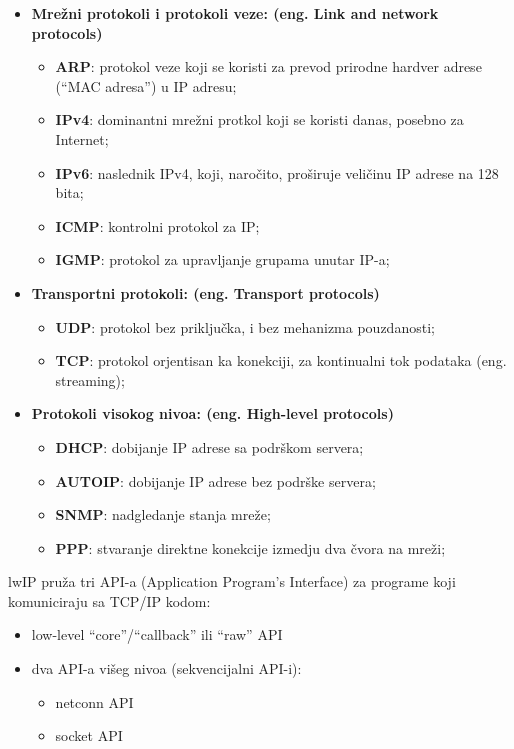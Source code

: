 \documentclass[a4paper,12pt, master]{etf}
\begin{document}
	\begin{itemize}
		\item \textbf{Mre\v{z}ni protokoli i protokoli veze: (eng\@. Link and network
		protocols)}
		\begin{itemize}
			\item \textbf{ARP}: protokol veze koji se koristi za prevod
			prirodne hardver adrese (``MAC adresa'') u IP adresu;
			\item \textbf{IPv4}: dominantni mre\v{z}ni protkol koji se koristi
			danas, posebno za Internet;
			\item \textbf{IPv6}: naslednik IPv4, koji, naro\v{c}ito,
			pro\v{s}iruje veli\v{c}inu IP adrese na 128 bita;
			\item \textbf{ICMP}: kontrolni protokol za IP;
			\item \textbf{IGMP}: protokol za upravljanje grupama unutar IP-a;
		\end{itemize}
		\item \textbf{Transportni protokoli: (eng\@. Transport protocols)}
			\begin{itemize}
				\item \textbf{UDP}: protokol bez priklju\v{c}ka, i bez
				mehanizma pouzdanosti;
				\item \textbf{TCP}: protokol orjentisan ka konekciji, za
				kontinualni tok	podataka (eng\@. streaming);
			\end{itemize}
		\item \textbf{Protokoli visokog nivoa: (eng\@. High-level protocols)}
			\begin{itemize}
				\item \textbf{DHCP}: dobijanje IP adrese sa podr\v{s}kom
				servera;
				\item \textbf{AUTOIP}: dobijanje IP adrese bez podr\v{s}ke
				servera;
				\item \textbf{SNMP}: nadgledanje stanja mre\v{z}e;
				\item \textbf{PPP}: stvaranje direktne konekcije izmedju dva
                    \v{c}vora na mre\v{z}i;
			\end{itemize}
	\end{itemize}

	lwIP pru\v{z}a tri API-a (Application Program's Interface) za programe koji
	komuniciraju sa	TCP/IP kodom:
	\begin{itemize}
		\item low-level ``core''/``callback'' ili ``raw'' API
		\item dva API-a vi\v{s}eg nivoa (sekvencijalni API-i):
			\begin{itemize}
				\item netconn API
				\item socket API
			\end{itemize}
	\end{itemize}
\end{document}

